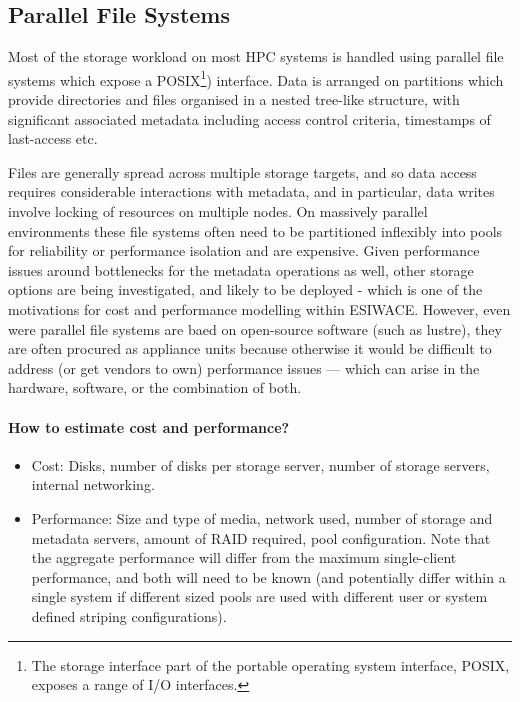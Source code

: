 \documentclass{../../template/esiwace-report}
\begin{document}

\subsection{Parallel File Systems}

Most of the storage workload on most HPC systems is handled using parallel file systems which expose a POSIX\footnote{The storage interface part of the portable operating system interface, POSIX, exposes a range of I/O interfaces.}) interface. Data is arranged on partitions which provide directories and files organised in a nested tree-like structure, with significant associated metadata including access control criteria, timestamps of last-access etc.

Files are generally spread across multiple storage targets, and so data access requires considerable interactions with metadata, and in particular, data writes involve locking of resources on multiple nodes.  On massively parallel environments these file systems often need to be partitioned inflexibly into pools for reliability or performance isolation and are expensive. Given performance issues around bottlenecks for the metadata operations as well, other storage options are being investigated, and likely to be deployed - which is one of the motivations for cost and performance modelling within ESIWACE. However, even were parallel file systems are baed on open-source software (such as lustre), they are  often procured as appliance units because otherwise it would be difficult to address (or get vendors to own) performance issues --- which can arise in the hardware, software, or the combination of both.

\paragraph{How to estimate cost and performance?}
\begin{itemize}
	\item Cost: Disks, number of disks per storage server, number of storage servers, internal networking.
	\item Performance: Size and type of media, network used, number of storage and metadata servers, amount of RAID required, pool configuration. Note that the aggregate performance will differ from the maximum single-client performance, and both will need to be known (and potentially differ within a single system if different sized pools are used with different user or system defined striping configurations).
\end{itemize}
\end{document}
